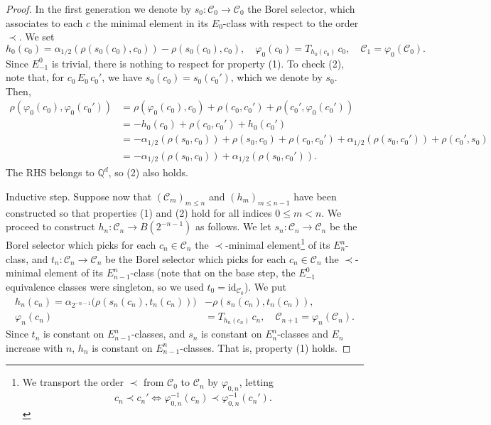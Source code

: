 \documentclass[11pt]{paper}
\newcommand{\bQ}{\mathbb Q}
\newcommand{\cC}{\mathcal C}
\begin{document}
\begin{proof}
\medskip{}
In the first generation we denote by $s_0\colon \cC_0\to\cC_0$
the Borel selector, which associates to each $c$ the minimal element
in its $E_0$-class with respect to the order $\prec$.
We set
\[
h_0(c_0)=\alpha_{1/2}(\rho(s_0(c_0), c_0)) - \rho(s_0(c_0), c_0),
\quad
\varphi_0 (c_0) = T_{h_0(c_0)}\, c_0,
\quad
\cC_1 = \varphi_0(\cC_0).
\]
Since $E_{-1}^0$ is trivial, there is nothing to respect for property (1).
To check (2), note that, for $c_0\, E_0\, c_0'$, we have $s_0(c_0)=s_0(c_0')$,
which we denote by $s_0$. Then,
\begin{align*}
\rho (\varphi_0(c_0), \varphi_0(c_0')) &= \rho (\varphi_0(c_0), c_0) +
\rho (c_0, c_0') + \rho(c_0', \varphi_0(c_0')) \\
&= - h_0(c_0) + \rho (c_0, c_0') + h_0(c_0') \\
&= -\alpha_{1/2}(\rho(s_0, c_0)) + \rho(s_0, c_0) + \rho (c_0, c_0')
+ \alpha_{1/2}(\rho(s_0, c_0')) + \rho(c_0', s_0) \\
&= -\alpha_{1/2}(\rho(s_0, c_0)) + \alpha_{1/2}(\rho(s_0, c_0')).
\end{align*}
The RHS belongs to $\bQ^d$, so (2) also holds.

\medskip\noindent
{\sf Inductive step}.
Suppose now that $(\cC_m)_{m\le n}$ and $(h_m)_{m\le {n-1}}$ have been constructed
so that properties (1) and (2) hold for all indices $0\le m<n$.
We proceed to construct $h_n\colon \cC_{n}\to B(2^{-n-1})$ as follows.
We let $s_n\colon \cC_n\to\cC_n$ be the Borel selector which picks for each $c_n\in\cC_n$
the $\prec$-minimal element\footnote{
We transport the order $\prec$ from $\cC_0$ to $\cC_n$ by $\varphi_{0, n}$, letting
\[
c_n \prec c_{n}' \Longleftrightarrow
\varphi_{0, n}^{-1} (c_n) \prec \varphi_{0, n}^{-1} (c_n').
\]
}
of its $E_{n}^n$-class, and $t_n\colon \cC_n\to\cC_n$ be
the Borel selector which picks for each $c_n\in\cC_n$ the $\prec$-minimal element of its
$E_{n-1}^n$-class (note that on the base step, the $E_{-1}^0$ equivalence classes were
singleton, so we used $t_0=\text{id}_{\cC_0}$). We put
\begin{align*}
h_n(c_n)=\alpha_{2^{-n-1}}\big(\rho(s_{n}(c_n), t_{n}(c_n))\big) &- \rho(s_{n}(c_n),t_{n}(c_n)), \\
\varphi_n (c_{n}) &= T_{h_n(c_n)}\, c_n, \quad \cC_{n+1} = \varphi_n(\cC_n).
\end{align*}
Since $t_n$ is constant on $E_{n-1}^n$-classes, and $s_n$ is constant on $E_n^n$-classes
and $E_n$ increase with $n$, $h_n$ is constant on $E_{n-1}^n$-classes. That is,
property (1) holds.


\end{proof}
\end{document}
